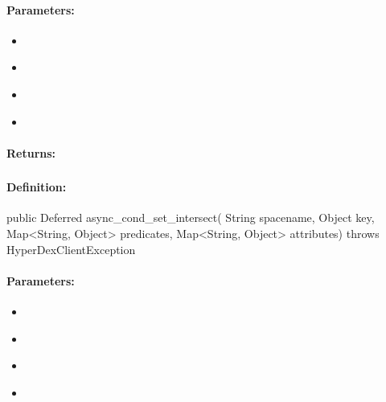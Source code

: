 \paragraph{Parameters:}
\begin{itemize}[noitemsep]
\item {}\\

\item {}\\

\item {}\\

\item {}\\

\end{itemize}

\paragraph{Returns:}


\pagebreak
\subsubsection{}
\label{api:java:async_cond_set_intersect}


\paragraph{Definition:}
\begin{javacode}
public Deferred async_cond_set_intersect(
        String spacename,
        Object key,
        Map<String, Object> predicates,
        Map<String, Object> attributes) throws HyperDexClientException
\end{javacode}

\paragraph{Parameters:}
\begin{itemize}[noitemsep]
\item {}\\

\item {}\\

\item {}\\

\item {}\\

\end{itemize}

